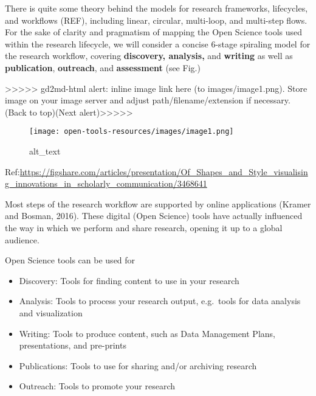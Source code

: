 \documentclass[
  letterpaper,
  DIV=11,
  numbers=noendperiod]{scrreport}
\providecommand{\tightlist}{%
  \setlength{\itemsep}{0pt}\setlength{\parskip}{0pt}}\usepackage{longtable,booktabs,array}
\begin{document}
There is quite some theory behind the models for research frameworks,
lifecycles, and workflows (REF), including linear, circular, multi-loop,
and multi-step flows. For the sake of clarity and pragmatism of mapping
the Open Science tools used within the research lifecycle, we will
consider a concise 6-stage spiraling model for the research workflow,
covering \textbf{discovery, analysis,} and \textbf{writing} as well as
\textbf{publication}, \textbf{outreach}, and \textbf{assessment} (see
Fig.)

{\textgreater\textgreater\textgreater\textgreater\textgreater{}
gd2md-html alert: inline image link here (to images/image1.png). Store
image on your image server and adjust path/filename/extension if
necessary. }(Back to top)(Next
alert){\textgreater\textgreater\textgreater\textgreater\textgreater{} }

\begin{figure}

{\centering \texttt{[image: open-tools-resources/images/image1.png]}

}

\caption{alt\_text}

\end{figure}

Ref:\url{https://figshare.com/articles/presentation/Of_Shapes_and_Style_visualising_innovations_in_scholarly_communication/3468641}

Most steps of the research workflow are supported by online applications
(Kramer and Bosman, 2016). These digital (Open Science) tools have
actually influenced the way in which we perform and share research,
opening it up to a global audience.

Open Science tools can be used for

\begin{itemize}
\tightlist
\item
  Discovery: Tools for finding content to use in your research
\item
  Analysis: Tools to process your research output, e.g.~tools for data
  analysis and visualization
\item
  Writing: Tools to produce content, such as Data Management Plans,
  presentations, and pre-prints
\item
  Publications: Tools to use for sharing and/or archiving research
\item
  Outreach: Tools to promote your research
\end{itemize}
\end{document}

